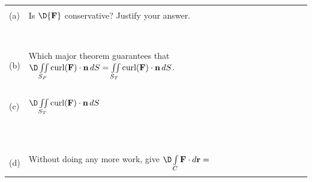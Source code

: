 \documentclass[12pt]{amsart}
\numberwithin{equation}{section}
\begin{document}
{{{{{\setlength{\extrarowheight}{0.1cm}
\begin{tabular}{p{0.35cm}p{20.6cm}}
	&\\
	(a) & Is $\D {\bf F}$ conservative? Justify your answer.\\
	&\\&\\&\\&\\&\\&\\&\\&\\
	(b) & Which major theorem guarantees that $\D \iint \limits_{S_P} \text{curl}({\bf F}) \cdot {\bf n} \, d{S} = \iint \limits_{S_T} \text{curl}({\bf F}) \cdot {\bf n} \, d{S}$. \\
	&\\&\\&\\&\\
	(c) & $\D \iint \limits_{S_T} \text{curl}({\bf F}) \cdot {\bf n} \, d{S}$ \\
	&\\&\\&\\&\\&\\&\\&\\&\\&\\&\\&\\
	(d) & Without doing any more work, give $\D \int \limits_{C} {\bf F} \cdot  d{\bf r} = $ \\
	&\\
\end{tabular}}

\thispagestyle{empty}
\newpage
\thispagestyle{empty}

}}}}
\end{document}
